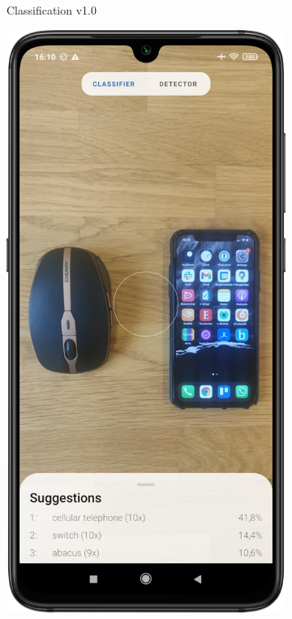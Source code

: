 \documentclass[
			   fontsize=11pt,
               paper=a4,
               bibliography=totoc,
               idxtotoc,
               headsepline,
               footsepline,
               footinclude=false,
               BCOR=12mm,
               DIV=13,
               openany,   %
               ]
               {scrbook}
\begin{document}
\begin{figure}[H]
\begin{subfigure}{.23\textwidth}
		\caption[Screenshots of the previous app in version 1.0 showing the classification activity]{Classification v1.0}
		\label{fig:appImage11}
	\end{subfigure}
	\hfil
	\begin{subfigure}{.23\textwidth}
		\centering
		\includegraphics[width=\linewidth]{figures/app_class_new.png}

\end{subfigure}
\end{figure}
\end{document}
